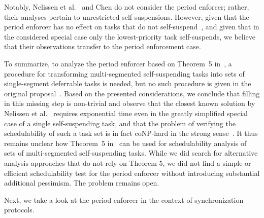 Notably, Nelissen et al.~\cite{ecrts15nelissen} and Chen \cite{RTSS2016-suspension} do not consider the period enforcer; rather, their analyses pertain to unrestricted self-suspensions. However, given that the period enforcer has no effect on tasks that do not self-suspend~\cite{Raj:suspension1991}, and given that in the considered special case only the lowest-priority task self-suspends, we believe that their observations transfer to the period enforcement case.

To summarize, to analyze the period enforcer based on Theorem~5 in~\cite{Raj:suspension1991}, a procedure for transforming multi-segmented self-suspending tasks into sets of single-segment deferrable tasks is needed, but no such procedure is given in the original proposal~\cite{Raj:suspension1991}.
%
Based on the presented considerations, we conclude that filling in this missing step is non-trivial and observe that the closest known solution by Nelissen et al.~\cite{ecrts15nelissen} requires exponential time even in the greatly simplified special case of a single self-suspending task, and that the problem of verifying the schedulability of such a task set is in fact coNP-hard in the strong sense~\cite{RTSS2016-suspension}. It thus remains unclear how Theorem~5 in~\cite{Raj:suspension1991} can be used for schedulability analysis of sets of multi-segmented self-suspending tasks. 
While we did search for alternative analysis approaches that do not rely on Theorem 5, we did not find a simple or efficient schedulability test for the period enforcer without introducing substantial additional pessimism.  The problem remains open. 

Next, we take a look at the period enforcer in the context of synchronization protocols.




